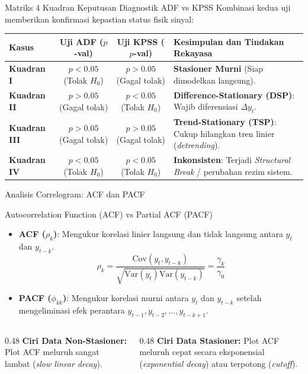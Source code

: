 \documentclass[aspectratio=169, 10pt]{beamer}
\begin{document}
\begin{frame}{Matriks 4 Kuadran Keputusan Diagnostik ADF vs KPSS}
    Kombinasi kedua uji memberikan konfirmasi kepastian status fisik sinyal:
    \begin{table}[h!]
    \centering
    \small
    \renewcommand{\arraystretch}{1.2}
    \begin{tabular}{|l|c|c|p{4.8cm}|}
    \hline
    \rowcolor{tableheader}
    \color{white}\textbf{Kasus} & \color{white}\textbf{Uji ADF ($p$-val)} & \color{white}\textbf{Uji KPSS ($p$-val)} & \color{white}\textbf{Kesimpulan dan Tindakan Rekayasa} \\ \hline
    \textbf{Kuadran I} & $p < 0.05$ (Tolak $H_0$) & $p > 0.05$ (Gagal tolak) & \textbf{Stasioner Murni} (Siap dimodelkan langsung). \\ \hline
    \textbf{Kuadran II} & $p > 0.05$ (Gagal tolak) & $p < 0.05$ (Tolak $H_0$) & \textbf{Difference-Stationary (DSP)}: Wajib diferensiasi $\Delta y_t$. \\ \hline
    \textbf{Kuadran III} & $p > 0.05$ (Gagal tolak) & $p > 0.05$ (Gagal tolak) & \textbf{Trend-Stationary (TSP)}: Cukup hilangkan tren linier (\textit{detrending}). \\ \hline
    \textbf{Kuadran IV} & $p < 0.05$ (Tolak $H_0$) & $p < 0.05$ (Tolak $H_0$) & \textbf{Inkonsisten}: Terjadi \textit{Structural Break} / perubahan rezim sistem. \\ \hline
    \end{tabular}
    \end{table}
\end{frame}

\begin{frame}{Analisis Correlogram: ACF dan PACF}
    \begin{block}{Autocorrelation Function (ACF) vs Partial ACF (PACF)}
        \begin{itemize}
            \item \textbf{ACF ($\rho_k$)}: Mengukur korelasi linier langsung dan tidak langsung antara $y_t$ dan $y_{t-k}$.
            \[
                \rho_k = \frac{\mathrm{Cov}(y_t, y_{t-k})}{\sqrt{\mathrm{Var}(y_t)\mathrm{Var}(y_{t-k})}} = \frac{\gamma_k}{\gamma_0}
            \]
            \item \textbf{PACF ($\phi_{kk}$)}: Mengukur korelasi murni antara $y_t$ dan $y_{t-k}$ setelah mengeliminasi efek perantara $y_{t-1}, y_{t-2}, \dots, y_{t-k+1}$.
        \end{itemize}
    \end{block}
    \begin{columns}[T]
        \begin{column}{0.48\textwidth}
            \textbf{Ciri Data Non-Stasioner:}
            Plot ACF meluruh sangat lambat (\textit{slow linear decay}).
        \end{column}
        \begin{column}{0.48\textwidth}
            \textbf{Ciri Data Stasioner:}
            Plot ACF meluruh cepat secara eksponensial (\textit{exponential decay}) atau terpotong (\textit{cutoff}).
        \end{column}
    \end{columns}
\end{frame}
\end{document}
